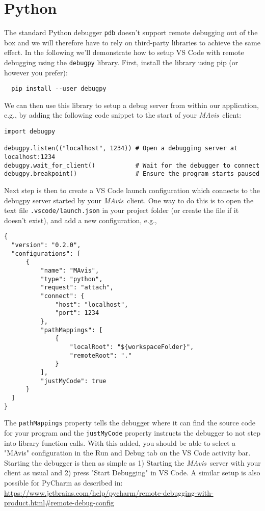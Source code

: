 \documentclass[10pt,a4paper]{article}
\def\mavis{{\itshape MAvis}}
\begin{document}
\section{Python}
The standard Python debugger \texttt{pdb} doesn't support remote debugging out of the box and we will therefore have to rely on third-party libraries to achieve the same effect.
In the following we'll demonstrate how to setup VS Code with remote debugging using the \texttt{debugpy} library.
First, install the library using pip (or however you prefer):
\begin{verbatim}
  pip install --user debugpy
\end{verbatim}
We can then use this library to setup a debug server from within our application, e.g., by adding the following code snippet to the start of your \mavis\ client:
\begin{verbatim}
import debugpy

debugpy.listen(("localhost", 1234)) # Open a debugging server at localhost:1234
debugpy.wait_for_client()           # Wait for the debugger to connect
debugpy.breakpoint()                # Ensure the program starts paused
\end{verbatim}
Next step is then to create a VS Code launch configuration which connects to the debugpy server started by your \mavis\ client.
One way to do this is to open the text file \texttt{.vscode/launch.json} in your project folder (or create the file if it doesn't exist), and add a new configuration, e.g.,
\begin{verbatim}
{
  "version": "0.2.0",
  "configurations": [
      {
          "name": "MAvis",
          "type": "python",
          "request": "attach",
          "connect": {
              "host": "localhost",
              "port": 1234
          },
          "pathMappings": [
              {
                  "localRoot": "${workspaceFolder}",
                  "remoteRoot": "."
              }
          ],
          "justMyCode": true
      }
  ]
}
\end{verbatim}
The \texttt{pathMappings} property tells the debugger where it can find the source code for your program and the \texttt{justMyCode} property instructs the debugger to not step into library function calls.
With this added, you should be able to select a "MAvis" configuration in the Run and Debug tab on the VS Code activity bar.
Starting the debugger is then as simple as 1) Starting the \mavis\ server with your client as usual and 2) press "Start Debugging" in VS Code.
A similar setup is also possible for PyCharm as described in: \newline \url{https://www.jetbrains.com/help/pycharm/remote-debugging-with-product.html#remote-debug-config}
\end{document}
